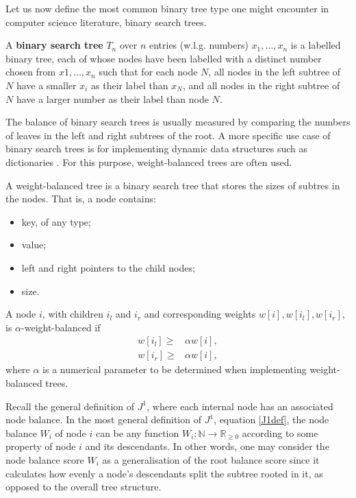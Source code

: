 Let us now define the most common binary tree type one might encounter in computer science literature, binary search trees.
\begin{definition}
    A \textbf{binary search tree} $T_n$ over $n$ entries (w.l.g. numbers) $x_1,\dots,x_n$ is a labelled binary tree, each of whose nodes have been labelled with a distinct number chosen from $x1,\dots,x_n$ such that for each node $N$, all nodes in the left subtree of $N$ have a smaller $x_i$ as their label than $x_N$, and all nodes in the right subtree of $N$ have a larger number as their label than node $N$.
\end{definition}
The balance of binary search trees is usually measured by comparing the numbers of leaves in the left and right subtrees of the root. A more specific use case of binary search trees is for implementing dynamic data structures such as dictionaries \cite{tsakalidis_maintaining_1984}. For this purpose, weight-balanced trees are often used.
\begin{definition}
    A weight-balanced tree is a binary search tree that stores the sizes of subtres in the nodes. That is, a node contains:
    \begin{itemize}
        \item key, of any type;
        \item value;
        \item left and right pointers to the child nodes;
        \item size.
    \end{itemize}
\end{definition}
\begin{definition}
    A node $i$, with children $i_l$ and $i_r$ and corresponding weights $w[i], w[i_l], w[i_r]$, is $\alpha$-weight-balanced if
    \begin{align}
        w[i_l] \geq & \alpha w[i], \label{weight-balance-left} \\
        w[i_r] \geq & \alpha w[i], \label{weight-balance-right}
    \end{align}
    where $\alpha$ is a numerical parameter to be determined when implementing weight-balanced trees.
\end{definition}
Recall the general definition of $J^1$, where each internal node has an associated node balance. In the most general definition of $J^1$, equation \eqref{J1def}, the node balance $W_i$ of node $i$ can be any function $W_i: \mathbb{N}\to\mathbb{R}_{\geq 0}$ according to some property of node $i$ and its descendants. In other words, one may consider the node balance score $W_i$ as a generalisation of the root balance score since it calculates how evenly a node's descendants split the subtree rooted in it, as opposed to the overall tree structure. \par

